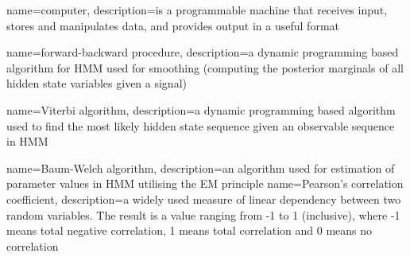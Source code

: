 %
%
%
{
	name=computer,
	description={is a programmable machine that receives input,
		stores and manipulates data, and provides
		output in a useful format}
}

{
	name={forward-backward procedure},
	description={a dynamic programming based algorithm for HMM used for smoothing (computing the posterior marginals of all hidden state variables given a signal)}
}

{
	name={Viterbi algorithm},
	description={a dynamic programming based algorithm used to find the most likely hidden state sequence given an observable sequence in HMM}
}
	
{
	name={Baum-Welch algorithm},
	description={an algorithm used for estimation of parameter values in HMM utilising the EM principle}
}
{
	name={Pearson's correlation coefficient},
	description={a widely used measure of linear dependency between two random variables. The result is a value ranging from -1 to 1 (inclusive), where -1 means total negative correlation, 1 means total correlation and 0 means no correlation}
}

%
%
%
%
%

%
%
%
